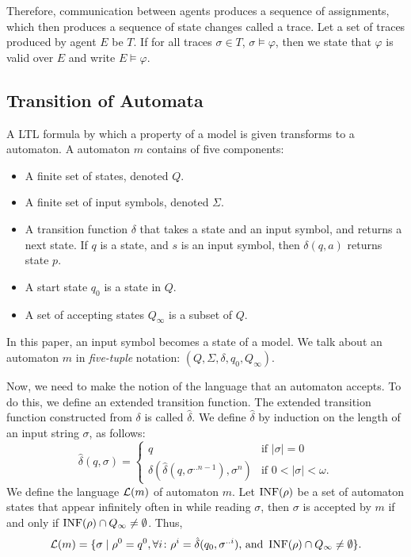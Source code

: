 \documentclass[12pt,a4paper,titlepage]{article}
\theoremstyle{break}
\begin{document}
Therefore, communication between agents produces a sequence of assignments, which then produces a sequence of state changes called a trace.
Let a set of traces produced by agent \(E\) be \(T\).
If for all traces \(\sigma\in T\), \(\sigma\models\varphi\), then we state that \(\varphi\) is valid over \(E\) and write \(E\models\varphi\).
%
%
\subsection{Transition of Automata}
A LTL formula by which a property of a model is given transforms to a \buchi automaton.
A \buchi automaton $m$ contains of five components:
  \begin{itemize}
\item A finite set of states, denoted $Q$.
\item A finite set of input symbols, denoted $\Sigma$.
\item A transition function $\delta$ that takes a state and an input symbol, and returns a next state.
If $q$ is a state, and $s$ is an input symbol, then \(\delta(q,a)\) returns state $p$.
\item A start state $q_0$ is a state in $Q$.
\item A set of accepting states $Q_{\infty}$ is a subset of $Q$.
  \end{itemize}
In this paper, an input symbol becomes a state of a model.
We talk about an automaton $m$ in \emph{five-tuple} notation: \((Q,\Sigma,\delta,q_0,Q_{\infty})\).

Now, we need to make the notion of the language that an automaton accepts.
To do this, we define an extended transition function.
The extended transition function constructed from $\delta$ is called \(\hat{\delta}\).
We define \(\hat{\delta}\) by induction on the length of an input string $\sigma$, as follows:
  \begin{displaymath}
\hat{\delta}(q,\sigma)=\left\{
      \begin{array}{ll}
q & \mbox{if \(|\sigma |=0\)}\\
\delta(\hat{\delta}(q,\sigma^{..n-1}),\sigma^{n}) & \mbox{if \(0<|\sigma |<\omega\)}.
      \end{array}
\right.
  \end{displaymath}
We define the language \({\cal L} (m)\) of automaton $m$.
Let \(\mathop{\mathrm{INF}}\nolimits(\rho)\) be a set of automaton states that appear infinitely often in while reading $\sigma$,
then $\sigma$ is accepted by $m$ if and only if \(\mathop{\mathrm{INF}}\nolimits(\rho)\cap Q_{\infty}\neq\emptyset\).
Thus,
  \begin{displaymath}
{\cal L}(m)=\{\sigma\mid \rho^0=q^0, \forall i\colon\rho^i=\hat{\delta}(q_0,\sigma^{..i})\mbox{, and }\mathop{\mathrm{INF}}\nolimits(\rho)\cap Q_{\infty}\neq\emptyset\}.
  \end{displaymath}
\end{document}
